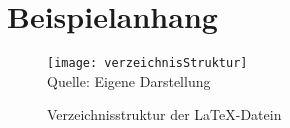 \section{Beispielanhang}\label{Beispielanhang}

\begin{figure}[H]
    \caption{Verzeichnisstruktur der \LaTeX{}-Datein}\label{fig:verzeichnisStruktur}
    \texttt{[image: verzeichnisStruktur]}
    \\
    Quelle: Eigene Darstellung
\end{figure}
